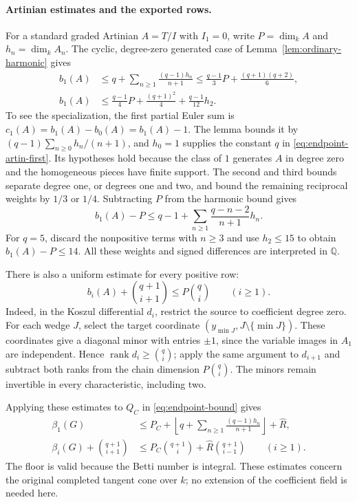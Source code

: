 \paragraph{Artinian estimates and the exported rows.}
For a standard graded Artinian $A=T/I$ with $I_1=0$, write
$P=\dim_k A$ and $h_n=\dim_k A_n$.
The cyclic, degree-zero generated case of
Lemma~\ref{lem:ordinary-harmonic} gives
\begin{align}
 b_1(A)&\le q+\sum_{n\ge1}\frac{(q-1)h_n}{n+1}
 \le \frac{q-1}{3}P+\frac{(q+1)(q+2)}6,
 \label{eq:endpoint-artin-first}\\
 b_1(A)&\le\frac{q-1}{4}P+\frac{(q+1)^2}{4}
                         +\frac{q-1}{12}h_2.\nonumber
\end{align}
To see the specialization, the first partial Euler sum is
$c_1(A)=b_1(A)-b_0(A)=b_1(A)-1$.
The lemma bounds it by
$(q-1)\sum_{n\ge0}h_n/(n+1)$, and $h_0=1$ supplies the constant
$q$ in \eqref{eq:endpoint-artin-first}. Its hypotheses hold because
the class of $1$ generates $A$ in degree zero and the homogeneous
pieces have finite support.
The second and third bounds separate degree one, or degrees one and two,
and bound the remaining reciprocal weights by $1/3$ or $1/4$.
Subtracting $P$ from the harmonic bound gives
\[
 b_1(A)-P\le q-1+\sum_{n\ge1}\frac{q-n-2}{n+1}h_n.
\]
For $q=5$, discard the nonpositive terms with $n\ge3$ and use
$h_2\le15$ to obtain $b_1(A)-P\le14$.
All these weights and signed differences are interpreted in $\mathbb Q$.

There is also a uniform estimate for every positive row:
\[
 b_i(A)+\binom{q+1}{i+1}\le P\binom qi\qquad(i\ge1).
\]
Indeed, in the Koszul differential $d_i$, restrict the source to
coefficient degree zero. For each wedge $J$, select the target coordinate
$(y_{\min J},J\setminus\{\min J\})$. These coordinates give a diagonal
minor with entries $\pm1$, since the variable images in $A_1$ are
independent. Hence $\operatorname{rank}d_i\ge\binom qi$; apply the
same argument to $d_{i+1}$ and subtract both ranks from the chain
dimension $P\binom qi$.
The minors remain invertible in every characteristic, including two.

Applying these estimates to $Q_C$ in \eqref{eq:endpoint-bound} gives
\begin{equation}\label{eq:endpoint-rows}
 \boxed{\begin{aligned}
 \beta_1(G)&\le P_C+
  \left\lfloor q+\sum_{n\ge1}\frac{(q-1)h_n}{n+1}\right\rfloor
  +\widehat R,\\
 \beta_i(G)+\binom{q+1}{i+1}
 &\le P_C\binom{q+1}i+\widehat R\binom{q+1}{i-1}
 \qquad(i\ge1).
 \end{aligned}}
\end{equation}
The floor is valid because the Betti number is integral.
These estimates concern the original completed tangent cone over $k$;
no extension of the coefficient field is needed here.

